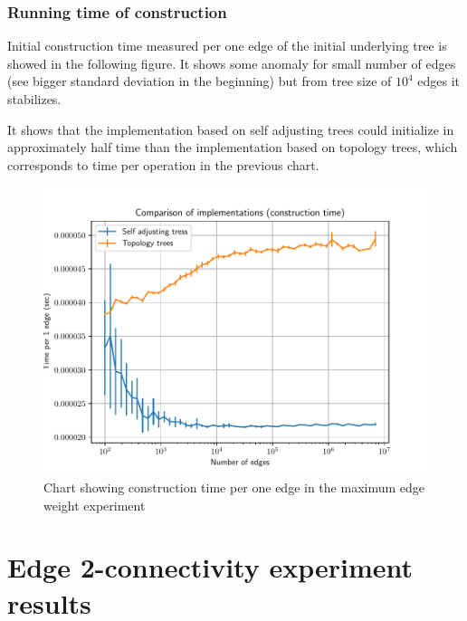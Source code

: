 \vfill\eject %

\subsubsection{Running time of construction}

Initial construction time measured per one edge of the initial underlying tree
is showed in the following figure. It shows some anomaly for small number of
edges (see bigger standard deviation in the beginning) but from tree size of
$10^4$ edges it stabilizes.

It shows that the implementation based on self adjusting trees could initialize
in approximately half time than the implementation based on topology trees,
which corresponds to time per operation in the previous chart.

\begin{figure}[H]
\centering
{}\hsize
\includegraphics[width=\hsize]{charts/maximum_edge_weight_construction.pdf}
\caption{Chart showing construction time per one edge in the maximum edge weight
experiment}
\end{figure}

\vfill\eject %


\section{Edge 2-connectivity experiment results}
\label{sec:results_edge_2_connectivity}

